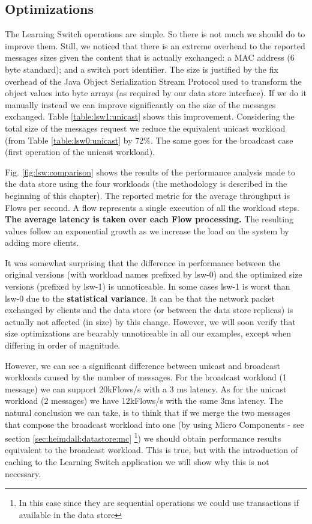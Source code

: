 \documentclass[12pt,openright,twoside]{report}
\begin{document}
\subsection{Optimizations}
The Learning Switch operations are simple. So there is not much we should do to improve them. 
Still, we noticed that there is an extreme overhead to the reported messages sizes given the content that is actually exchanged: a MAC address (6 byte standard); and  a switch port identifier.  
The size is justified by the fix overhead of the Java Object Serialization Stream Protocol used to transform the object values into byte arrays (as required by our data store interface). 
If we do it manually instead we can improve  significantly on the size of the messages exchanged. Table  \ref{table:lsw1:unicast} shows this improvement. 
Considering the total size of the messages request  we reduce the equivalent unicast workload (from Table \ref{table:lsw0:unicast} by 72\%. The same goes for the broadcast case (first operation of the unicast workload). 

Fig. \ref{fig:lsw:comparison} shows the results of the performance analysis made to the data store using the four workloads (the methodology is described in the beginning of this chapter). 
The reported metric for the average throughput  is Flows per second.
A flow represents a single execution of all the workload steps. 
\textbf{The average latency is taken over each Flow processing. }
The resulting values follow an exponential growth as we increase the load on the system by adding more clients. 

It was somewhat surprising that the difference in performance between the original versions (with workload names prefixed by lsw-0) and the optimized size versions (prefixed by lsw-1) is unnoticeable. In some cases lsw-1 is worst than lsw-0 due to the \textbf{statistical variance}. 
It can be that the network packet exchanged by clients and the data store (or between the data store replicas) is actually not affected (in size) by this change. 
However, we will soon verify that size optimizations are bearably unnoticeable in all our examples, except when differing in order of magnitude. 

However, we can see a significant difference between unicast and broadcast workloads caused by the number of messages. 
For the broadcast workload (1 message) we can support 20kFlows/s with a 3 ms latency.  
As for the unicast workload (2 messages) we have 12kFlows/s with the same 3ms latency. 
The natural conclusion we can take, is to think that if we merge the two messages that compose the broadcast workload into one (by using Micro Components - see section \ref{sec:heimdall:datastore:mc} \footnote{In this case since they are sequential operations we could use transactions if available in the data store}) we should obtain performance results equivalent to the broadcast workload. 
This is true, but with the introduction of caching to the Learning Switch application we will show why this is not necessary. 
\end{document}
